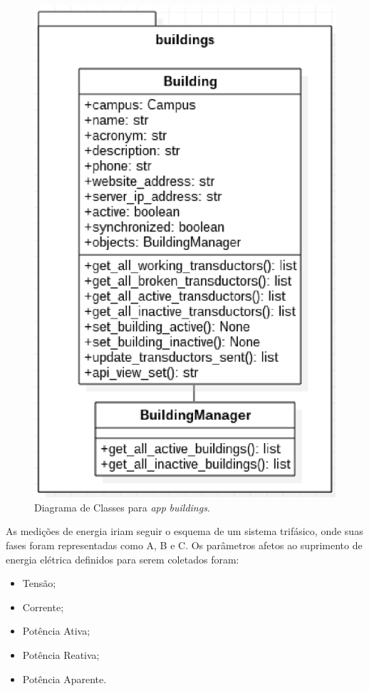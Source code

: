 \begin{figure}[!h]
    \centering
    \includegraphics[keepaspectratio=true,scale=0.8]{figuras/buildings.eps}
    \caption{Diagrama de Classes para \textit{app} \textit{buildings}.}
    \label{buildings}
\end{figure}

As medições de energia iriam seguir o esquema de um sistema trifásico, onde suas fases foram representadas como A, B e C. Os parâmetros afetos ao suprimento de energia elétrica
definidos para serem coletados foram:

\begin{itemize}
    \item Tensão;
    \item Corrente;
    \item Potência Ativa;
    \item Potência Reativa;
    \item Potência Aparente.
\end{itemize}

